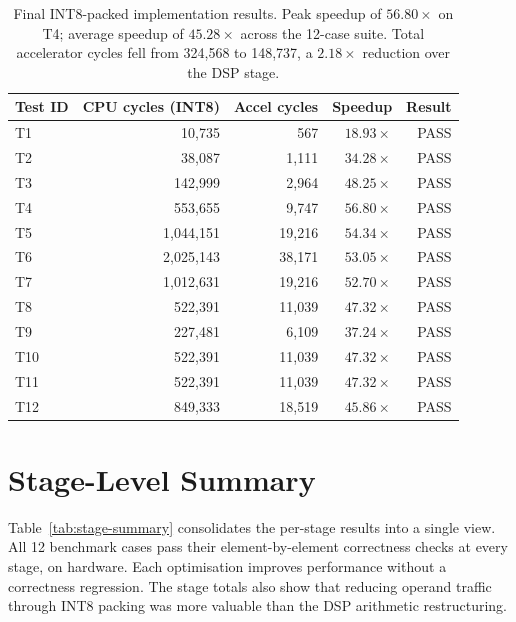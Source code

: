 \begin{table}[htbp]
  \centering
  \small
  \setlength{\tabcolsep}{14pt} %
  \begin{tabular}{lrrrr}
  \toprule
  Test ID & CPU cycles (INT8) & Accel cycles & Speedup & Result \\
  \midrule
  T1  & 10,735   &    567 & $18.93\times$ & PASS \\
  T2  & 38,087   &  1,111 & $34.28\times$ & PASS \\
  T3  & 142,999  &  2,964 & $48.25\times$ & PASS \\
  T4  & 553,655  &  9,747 & $\mathbf{56.80\times}$ & PASS \\
  T5  & 1,044,151 & 19,216 & $54.34\times$ & PASS \\
  T6  & 2,025,143 & 38,171 & $53.05\times$ & PASS \\
  T7  & 1,012,631 & 19,216 & $52.70\times$ & PASS \\
  T8  & 522,391  & 11,039 & $47.32\times$ & PASS \\
  T9  & 227,481  &  6,109 & $37.24\times$ & PASS \\
  T10 & 522,391  & 11,039 & $47.32\times$ & PASS \\
  T11 & 522,391  & 11,039 & $47.32\times$ & PASS \\
  T12 & 849,333  & 18,519 & $45.86\times$ & PASS \\
  \bottomrule
  \end{tabular}
  \caption{Final INT8-packed implementation results. Peak speedup of
           $56.80\times$ on T4; average speedup of $45.28\times$ across
           the 12-case suite. Total accelerator cycles fell from 324,568
           to 148,737, a $2.18\times$ reduction over the DSP stage.}
  \label{tab:int8-results}
\end{table}

\section{Stage-Level Summary}

Table~\ref{tab:stage-summary} consolidates the per-stage results into
a single view. All 12 benchmark cases pass their element-by-element
correctness checks at every stage, on hardware. Each optimisation
improves performance without a correctness regression. The stage totals
also show that reducing operand traffic through INT8 packing was more
valuable than the DSP arithmetic restructuring.

